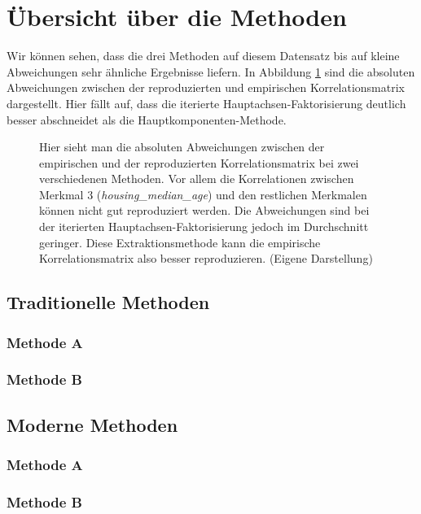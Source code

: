 \section{Übersicht über die Methoden}
\label{sec:Übersicht}

Wir können sehen, dass die drei Methoden auf diesem Datensatz bis auf kleine Abweichungen sehr ähnliche Ergebnisse liefern.
In Abbildung \ref{fig:Residualmatrizen} sind die absoluten Abweichungen zwischen der reproduzierten und empirischen Korrelationsmatrix dargestellt. Hier fällt auf, dass die iterierte Hauptachsen-Faktorisierung deutlich besser abschneidet als die Hauptkomponenten-Methode.
\begin{figure}[h]
	
	\caption[(Absolute) Residualmatrizen als Heatmap]{Hier sieht man die absoluten Abweichungen zwischen der empirischen und der reproduzierten Korrelationsmatrix bei zwei verschiedenen Methoden. Vor allem die Korrelationen zwischen Merkmal 3 (\textit{housing\_median\_age}) und
		den restlichen Merkmalen können nicht gut reproduziert werden. Die Abweichungen sind bei der iterierten Hauptachsen-Faktorisierung
		jedoch im Durchschnitt geringer. Diese Extraktionsmethode kann die empirische Korrelationsmatrix also besser reproduzieren.
		(Eigene Darstellung)}
	\label{fig:Residualmatrizen}
\end{figure}


\subsection{Traditionelle Methoden}

\subsubsection{Methode A}
\subsubsection{Methode B}

\subsection{Moderne Methoden}
\subsubsection{Methode A}
\subsubsection{Methode B}

	
